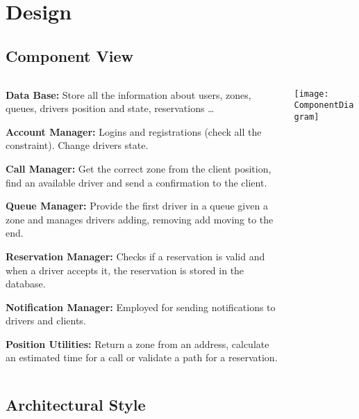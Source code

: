 \section{Design}

\subsection{Component View}

\begin{frame}{\currentname}

\begin{columns}[c]
  \begin{column}{.4\textwidth}
    \begin{small}\textbf{Data Base:} Store all the information about users, zones, queues, drivers position and state, reservations \ldots
        
        \textbf{Account Manager:} Logins and registrations (check all the constraint). Change drivers state.
        
        \textbf{Call Manager:} Get the correct zone from the client position, find an available driver and send a confirmation to the client.
        
        \textbf{Queue Manager:} Provide the first driver in a queue given a zone and manages drivers adding, removing add moving to the end.
        
        \textbf{Reservation Manager:} Checks if a reservation is valid and when a driver accepts it, the reservation is stored in the database.
        
        \textbf{Notification Manager:} Employed for sending notifications to drivers and clients.
        
        \textbf{Position Utilities:} Return a zone from an address, calculate an estimated time for a call or validate a path for a reservation.
        
    \end{small}
  \end{column}
  \begin{column}{.6\textwidth}
    \texttt{[image: ComponentDiagram]}
	\centering
  \end{column}
\end{columns}

\end{frame}

\subsection{Architectural Style}

